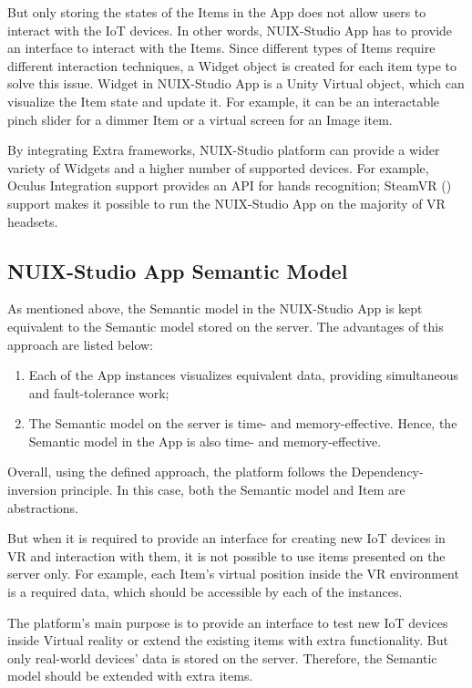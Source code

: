 But only storing the states of the Items in the App does not allow users to interact with the IoT devices. In other words, NUIX-Studio App has to provide an interface to interact with the Items. Since different types of Items require different interaction techniques, a Widget object is created for each item type to solve this issue.
Widget in NUIX-Studio App is a Unity Virtual object, which can visualize the Item state and update it. For example, it can be an interactable pinch slider for a dimmer Item or a virtual screen for an Image item.

By integrating Extra frameworks, NUIX-Studio platform can provide a wider variety of Widgets and a higher number of supported devices. For example, Oculus Integration support provides an API for hands recognition; SteamVR (\cite{SteamVR2021}) support makes it possible to run the NUIX-Studio App on the majority of VR headsets.

\subsection{NUIX-Studio App Semantic Model}

As mentioned above, the Semantic model in the NUIX-Studio App is kept equivalent to the Semantic model stored on the server. The advantages of this approach are listed below:

\begin{enumerate}
    \item Each of the App instances visualizes equivalent data, providing simultaneous and fault-tolerance work;
    \item The Semantic model on the server is time- and memory-effective. Hence, the Semantic model in the App is also time- and memory-effective.
\end{enumerate}

Overall, using the defined approach, the platform follows the Dependency-inversion principle. In this case, both the Semantic model and Item are abstractions.

But when it is required to provide an interface for creating new IoT devices in VR and interaction with them, it is not possible to use items presented on the server only. For example, each Item's virtual position inside the VR environment is a required data, which should be accessible by each of the instances.

The platform's main purpose is to provide an interface to test new IoT devices inside Virtual reality or extend the existing items with extra functionality. But only real-world devices' data is stored on the server. Therefore, the Semantic model should be extended with extra items. 